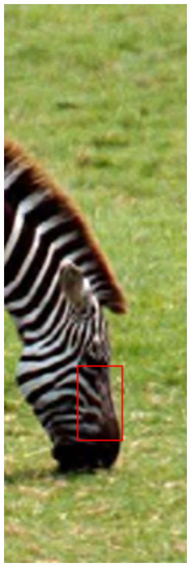 \documentclass[review,numbers,sort&compress]{elsarticle}  %
\begin{document}
\begin{figure}[t]
{\begin{minipage}[b]{0.12\textwidth}
                \includegraphics[width=1\textwidth]{compareImage/zebra_crop_SME.png} \\

\end{minipage}}
\end{figure}
\end{document}
